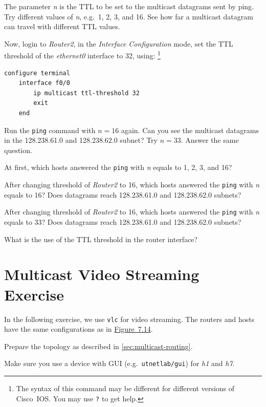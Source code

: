\documentclass{../UTNetLab}
\begin{document}
    The parameter \textit{n} is the TTL to be set to the multicast datagrams sent by ping.
    Try different values of \textit{n}, e.g.\ 1, 2, 3, and 16.
    See how far a multicast datagram can travel with different TTL values. 

    Now, login to \textit{Router2}, in the \textit{Interface Configuration} mode, set the TTL threshold of the \textit{ethernet0} interface to 32, using:%
    \footnote{The syntax of this command may be different for different versions of Cisco~IOS. You may use \lstinline[language={cisco}]{?} to get help.}
    \begin{lstlisting}[language={cisco}]    
configure terminal
    interface f0/0
        ip multicast ttl-threshold 32
        exit
    end
    \end{lstlisting}

    Run the \lstinline{ping} command with $n = 16$ again.
    Can you see the multicast datagrams in the 128.238.61.0 and 128.238.62.0 subnet?
    Try $n = 33$.
    Answer the same question.
    
    \begin{report}
    \item At first, which hosts answered the \lstinline{ping} with \textit{n} equals to 1, 2, 3, and 16?
    \item After changing threshold of \textit{Router2} to 16, which hosts answered the \lstinline{ping} with \textit{n} equals to 16?
    Does datagrams reach 128.238.61.0 and 128.238.62.0 subnets?
    \item After changing threshold of \textit{Router2} to 16, which hosts answered the \lstinline{ping} with \textit{n} equals to 33?
    Does datagrams reach 128.238.61.0 and 128.238.62.0 subnets?
    
    \item What is the use of the TTL threshold in the router interface?
    \end{report}

\part{Multicast Video Streaming Exercise}
    In the following exercise, we use \lstinline{vlc} for video streaming.
    The routers and hosts have the same configurations as in \hyperref[fig:7.14]{Figure~7.14}.

    Prepare the topology as described in \autoref{sec:multicast-routing}.

    Make sure you use a device with GUI (e.g.\ \texttt{utnetlab/gui}) for \textit{h1} and \textit{h7}.
\end{document}
